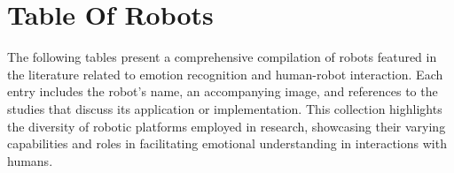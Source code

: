 \clearpage{}
\section{Table Of Robots}
The following tables present a comprehensive compilation of robots featured in the literature related to emotion recognition and human-robot interaction. Each entry includes the robot's name, an accompanying image, and references to the studies that discuss its application or implementation. This collection highlights the diversity of robotic platforms employed in research, showcasing their varying capabilities and roles in facilitating emotional understanding in interactions with humans.
\begin{table}[h]
\centering{}
\caption{Table of all Robots in Literature}
\hspace*{-1in}
\end{table}
